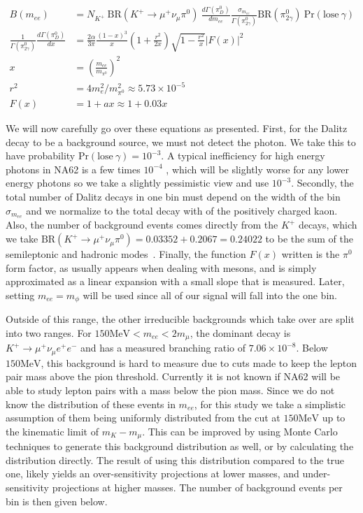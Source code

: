 \begin{align}
\label{eqn:kaon_dalitz_background}
B(m_{ee}) &= N_{K^+}~\textrm{BR}(K^+ \rightarrow \mu^+ \nu_\mu \pi^0)~\frac{d\Gamma(\pi^0_D)}{d m_{ee}} \frac{\sigma_{m_{ee}}}{\Gamma(\pi^0_{2\gamma})} \textrm{BR}(\pi^0_{2\gamma})~\textrm{Pr}(\textrm{lose}~\gamma) \\
\frac{1}{\Gamma(\pi^0_{2\gamma})} \frac{d\Gamma(\pi^0_D)}{dx} &= \frac{2\alpha}{3\pi} \frac{(1-x)^3}{x}(1+\frac{r^2}{2x})\sqrt{1-\frac{r^2}{x}}\left|F(x)\right|^2 \\
x &= \left(\frac{m_{ee}}{m_{\pi^0}}\right)^2 \\
r^2 &= 4 m_e^2 / m_{\pi^0}^2 \approx 5.73\times 10^{-5} \\
F(x) &= 1 + ax \approx 1+0.03x
\end{align}

We will now carefully go over these equations as presented.
First, for the Dalitz decay to be a background source, we must not detect the photon.
We take this to have probability $\textrm{Pr}(\textrm{lose}~\gamma) = 10^{-3}$.
A typical inefficiency for high energy photons in NA62 is a few times $10^{-4}$ \cite{Martellotti:2015kna}, which will be slightly worse for any lower energy photons so we take a slightly pessimistic view and use $10^{-3}$.
Secondly, the total number of Dalitz decays in one bin must depend on the width of the bin $\sigma_{m_{ee}}$ and we normalize to the total decay with of the positively charged kaon.
Also, the number of background events comes directly from the $K^+$ decays, which we take $\textrm{BR}(K^+ \rightarrow \mu^+ \nu_\mu \pi^0) = 0.03352 + 0.2067 = 0.24022$ to be the sum of the semileptonic and hadronic modes~\cite{Agashe:2014kda}.
Finally, the function $F(x)$ written is the $\pi^0$ form factor, as usually appears when dealing with mesons, and is simply approximated as a linear expansion with a small slope that is measured.
Later, setting $m_{ee} = m_\phi$ will be used since all of our signal will fall into the one bin.

Outside of this range, the other irreducible backgrounds which take over are split into two ranges.
For $150\textrm{MeV} < m_{ee} < 2m_\mu$, the dominant decay is $K^+ \rightarrow \mu^+ \nu_\mu e^+ e^-$ and has a measured branching ratio of $7.06 \times 10^{-8}$.
Below $150\textrm{MeV}$, this background is hard to measure due to cuts made to keep the lepton pair mass above the pion threshold.
Currently it is not known if NA62 will be able to study lepton pairs with a mass below the pion mass.
Since we do not know the distribution of these events in $m_{ee}$, for this study we take a simplistic assumption of them being uniformly distributed from the cut at $150\textrm{MeV}$ up to the kinematic limit of $m_K - m_\mu$.
This can be improved by using Monte Carlo techniques to generate this background distribution as well, or by calculating the distribution directly.
The result of using this distribution compared to the true one, likely yields an over-sensitivity projections at lower masses, and under-sensitivity projections at higher masses.
The number of background events per bin is then given below.

